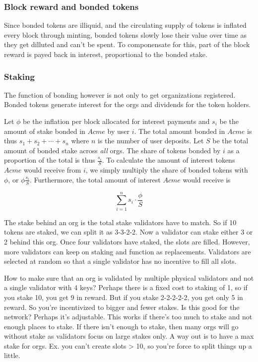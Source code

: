 \subsubsection{Block reward and bonded tokens}

Since bonded tokens are illiquid, and the circulating supply of tokens is
inflated every block through minting, bonded tokens slowly lose their value
over time as they get dilluted and can't be spent. To componensate for this,
part of the block reward is payed back in interest, proportional to the bonded
stake.

\subsubsection{Staking}

The function of bonding however is not only to get organizations registered.
Bonded tokens generate interest for the orgs and dividends for the token holders.

Let $\phi$ be the inflation per block allocated for interest payments and $s_i$
be the amount of stake bonded in $Acme$ by user $i$. The total amount bonded in
$Acme$ is thus $s_1 + s_2 + \cdots + s_n$ where $n$ is the number of user
deposits.  Let $S$ be the total amount of bonded stake across \emph{all} orgs.
The share of tokens bonded by $i$ as a proportion of the total is thus
$\frac{s_i}{S}$. To calculate the amount of interest tokens $Acme$ would
receive from $i$, we simply multiply the share of bonded tokens with $\phi$, or
$\phi \frac{s_i}{S}$. Furthermore, the total amount of interest $Acme$ would
receive is

\begin{equation*}
\sum_{i=1}^n s_i \cdot \frac{\phi}{S}
\end{equation*}

{\color{red}
    The stake behind an org is the total stake validators have to match. So if
    10 tokens are staked, we can split it as 3-3-2-2. Now a validator can stake
    either 3 or 2 behind this org. Once four validators have staked, the slots
    are filled. However, more validators can keep on staking and function as
    replacements. Validators are selected at random so that a single validator
    has no incentive to fill all slots.

    How to make sure that an org is validated by multiple physical validators
    and not a single validator with 4 keys? Perhaps there is a fixed cost to
    staking of 1, so if you stake 10, you get 9 in reward. But if you stake
    2-2-2-2-2, you get only 5 in reward. So you're incentivized to bigger and
    fewer stakes. Is this good for the network? Perhaps it's adjustable. This
    works if there's too much to stake and not enough places to stake. If there
    isn't enough to stake, then many orgs will go without stake as validators
    focus on large stakes only. A way out is to have a max stake for orgs. Ex.
    you can't create slots > 10, so you're force to split things up a little.
}

